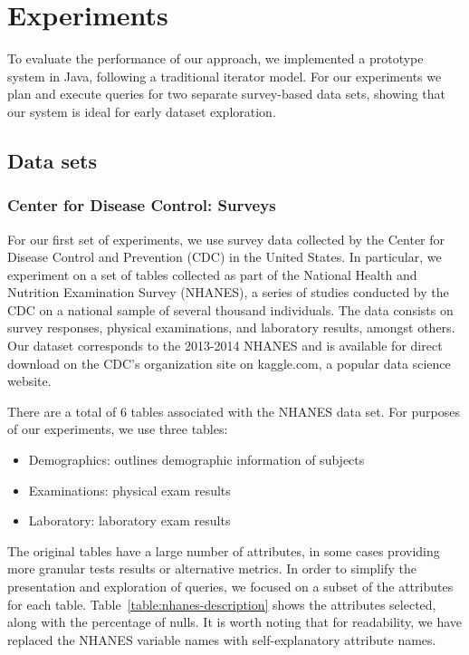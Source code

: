 \section{Experiments}\label{sec:experiments}
To evaluate the performance of our approach,  we implemented
a prototype system in Java, following a traditional iterator model.
For our experiments we plan and execute queries
for two separate survey-based data sets, showing that our system
is ideal for early dataset exploration.

\subsection{Data sets} \label{subsec:datasets}
\subsubsection{Center for Disease Control: Surveys}
For our first set of experiments, we use survey data collected by the 
Center for Disease Control and Prevention (CDC) in the United States. In particular, we
experiment on a set of tables collected as part of the National
Health and Nutrition Examination Survey (NHANES), a series of studies
conducted by the CDC on a national sample of several thousand individuals\cite{cdc-data}.
The data consists on survey responses, physical examinations, and laboratory
results, amongst others. Our dataset corresponds to the 2013-2014 NHANES
and is available for direct download on the CDC's organization site on 
kaggle.com, a popular data science website.

There are a total of 6 tables associated with the NHANES data set. For purposes
of our experiments, we use three tables:

\begin{itemize}
	\item Demographics: outlines demographic information of subjects
	\item Examinations: physical exam results
	\item Laboratory: laboratory exam results
\end{itemize}

The original tables have a large number of attributes, in some cases providing more granular
tests results or alternative metrics. In order to simplify the presentation and
exploration of queries, we focused on a subset of the attributes for each table.
Table~\ref{table:nhanes-description} shows the attributes selected, along with the
percentage of nulls. It is worth noting that for readability, we have replaced the
NHANES variable names with self-explanatory attribute names.

